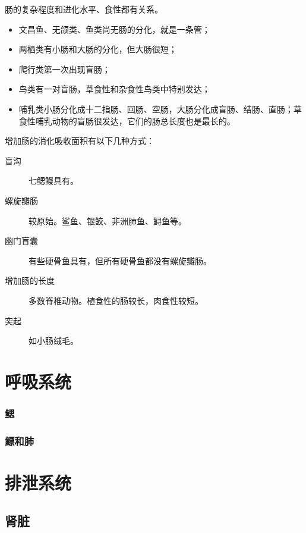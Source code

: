 肠的复杂程度和进化水平、食性都有关系。

\begin{itemize}
	\item 文昌鱼、无颌类、鱼类尚无肠的分化，就是一条管；
	\item 两栖类有小肠和大肠的分化，但大肠很短；
	\item 爬行类第一次出现盲肠；
	\item 鸟类有一对盲肠，草食性和杂食性鸟类中特别发达；
	\item 哺乳类小肠分化成十二指肠、回肠、空肠，大肠分化成盲肠、结肠、直肠；草食性哺乳动物的盲肠很发达，它们的肠总长度也是最长的。
\end{itemize}

增加肠的消化吸收面积有以下几种方式：

\begin{description}
	\item[盲沟] 七鳃鳗具有。
	\item[螺旋瓣肠] 较原始。鲨鱼、银鲛、非洲肺鱼、鲟鱼等。
	\item[幽门盲囊] 有些硬骨鱼具有，但所有硬骨鱼都没有螺旋瓣肠。
	\item[增加肠的长度] 多数脊椎动物。植食性的肠较长，肉食性较短。
	\item[突起] 如小肠绒毛。
\end{description}

\section{呼吸系统}

\subsubsection{鳃}



\subsubsection{鳔和肺}

\section{排泄系统}

\subsection{肾脏}

